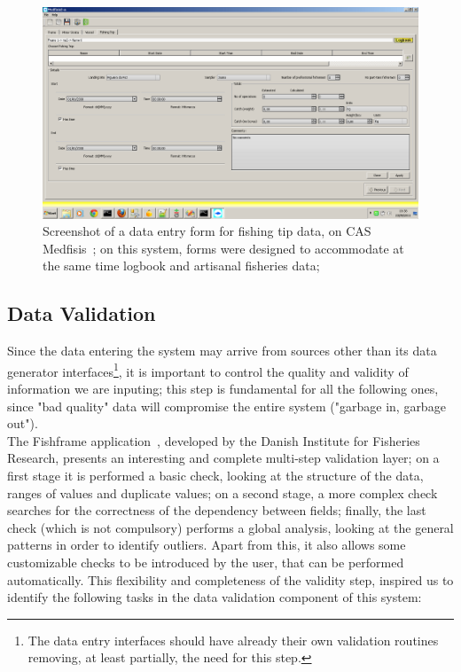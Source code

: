 \documentclass[11pt]{article} %
\begin{document}
  \begin{figure}[!ht]%
    \begin{center} 
	\includegraphics[width=\textwidth ]{fishing_trip_small}
      \caption[Screenshot of a data entry form for fishing tip data, on CAS Medfisis~\cite{medfisis}; on this system, forms were designed to accommodate at the same time logbook and artisanal fisheries data;] {Screenshot of a data entry form for fishing tip data, on CAS Medfisis~\cite{medfisis}; on this system, forms were designed to accommodate at the same time logbook and artisanal fisheries data;}
    \end{center} 
  \end{figure}

\subsection{Data Validation}\label{validation}
Since the data entering the system may arrive from sources other than its data generator interfaces\footnote{The data entry interfaces should have already their own validation routines removing, at least partially, the need for this step.}, it is important to control the quality and validity of information we are inputing; this step is fundamental for all the following ones, since "bad quality" data will compromise the entire system ("garbage in, garbage out").\\
The Fishframe application~\cite{fishframe}, developed by the Danish Institute for Fisheries Research, presents an interesting and complete multi-step validation layer; on a first stage it is performed a basic check, looking at the structure of the data, ranges of values and duplicate values; on a second stage, a more complex check searches for the correctness of the dependency between fields; finally, the last check (which is not compulsory) performs a global analysis, looking at the general patterns in order to identify outliers. Apart from this, it also allows some customizable checks to be introduced by the user, that can be performed automatically. This flexibility and completeness of the validity step, inspired us to identify the following tasks in the data validation component of this system:
\end{document}
